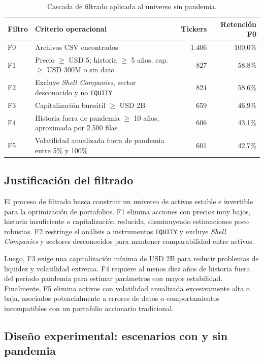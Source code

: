 \begin{table}[h]
\centering
\caption{Cascada de filtrado aplicada al universo sin pandemia.}
\label{tab:filtrado_sin}
\small
\begin{tabular}{@{}p{}p{}rr@{}}
\toprule
Filtro & Criterio operacional & Tickers & Retenci\'on F0 \\
\midrule
F0 & Archivos CSV encontrados & 1.406 & 100,0\% \\
F1 & Precio $\geq$ USD 5; historia $\geq$ 5 a\~nos; cap. $\geq$ USD 300M o sin dato & 827 & 58,8\% \\
F2 & Excluye \emph{Shell Companies}, sector desconocido y no \texttt{EQUITY} & 824 & 58,6\% \\
F3 & Capitalizaci\'on burs\'atil $\geq$ USD 2B & 659 & 46,9\% \\
F4 & Historia fuera de pandemia $\geq$ 10 a\~nos, aproximada por 2.500 filas & 606 & 43,1\% \\
F5 & Volatilidad anualizada fuera de pandemia entre 5\% y 100\% & 601 & 42,7\% \\
\bottomrule
\end{tabular}
\end{table}

\subsection{Justificaci\'on del filtrado}

El proceso de filtrado busca construir un universo de activos estable e invertible para la optimizaci\'on de portafolios. F1 elimina acciones con precios muy bajos, historia insuficiente o capitalizaci\'on reducida, disminuyendo estimaciones poco robustas. F2 restringe el an\'alisis a instrumentos \texttt{EQUITY} y excluye \textit{Shell Companies} y sectores desconocidos para mantener comparabilidad entre activos.

Luego, F3 exige una capitalizaci\'on m\'inima de USD 2B para reducir problemas de liquidez y volatilidad extrema. F4 requiere al menos diez a\~nos de historia fuera del periodo pandemia para estimar par\'ametros con mayor estabilidad. Finalmente, F5 elimina activos con volatilidad anualizada excesivamente alta o baja, asociados potencialmente a errores de datos o comportamientos incompatibles con un portafolio accionario tradicional.


\subsection{Dise\~no experimental: escenarios con y sin pandemia}

